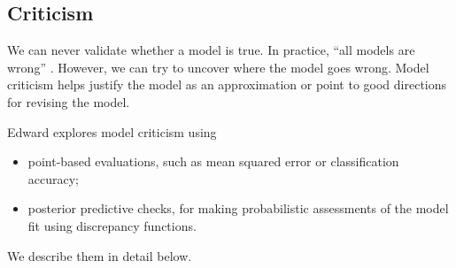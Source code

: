\subsection{Criticism}

We can never validate whether a model is true. In practice, ``all
models are wrong'' \citep{box1976science}. However, we can try to
uncover where the model goes wrong. Model criticism helps justify the
model as an approximation or point to good directions for revising the
model.

Edward explores model criticism using
\begin{itemize}
  \item point-based evaluations, such as mean squared error or
  classification accuracy;
  \item posterior predictive checks, for making probabilistic
  assessments of the model fit using discrepancy functions.
\end{itemize}

We describe them in detail below.
